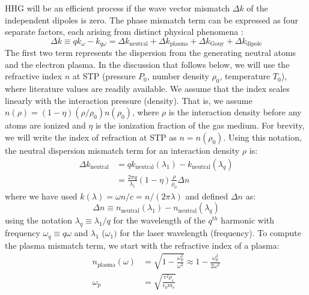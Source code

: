 HHG will be an efficient process if the wave vector mismatch $\Delta k$ of the independent dipoles is zero. The phase mismatch term can be expressed as four separate factors, each arising from distinct physical phenomena \cite{rothhardtAbsorptionlimitedPhasematchedHigh2014}:
\begin{equation}
\Delta k \equiv q k_{\omega} - k_{q \omega} = \Delta k_{\textrm{neutral}} + \Delta k_{\textrm{plasma}} + \Delta k_{\textrm{Gouy}} + \Delta k_{\textrm{dipole}}
\label{eqn:phase_mismatch}
\end{equation}
The first two term represents the dispersion from the generating neutral atoms and the electron plasma. In the discussion that follows below, we will use the refractive index $n$ at STP (pressure $P_0$, number density $\rho_0$, temperature $T_0$), where literature values are readily available. We assume that the index scales linearly with the interaction pressure (density). That is, we assume $n(\rho) = (1-\eta)(\rho / \rho_0) n(\rho_0)$, where $\rho$ is the interaction density before any atoms are ionized and $\eta$ is the ionization fraction of the gas medium. For brevity, we will write the index of refraction at STP as $n = n(\rho_0)$. Using this notation, the neutral dispersion mismatch term for an interaction density $\rho$ is:
\begin{align}
\Delta k_{\textrm{neutral}} &= q k_{\textrm{neutral}}(\lambda_1) - k_{\textrm{neutral}}(\lambda_{q}) \nonumber \\
&= \frac{2 \pi q}{\lambda_1} (1-\eta) \frac{\rho}{\rho_0}\Delta n
\label{eqn:deltak_neutral}
\end{align}
where we have used $k(\lambda)= \omega n /c = n / (2 \pi \lambda)$ and defined $\Delta n$ as:
\begin{equation}
\Delta n \equiv n_{\textrm{neutral}}(\lambda_1) - n_{\textrm{neutral}}(\lambda_q)
\end{equation}
using the notation $\lambda_q \equiv \lambda_1 / q$ for the wavelength of the $q^{th}$ harmonic with frequency $\omega_q \equiv q \omega$ and $\lambda_1$ ($\omega_1)$ for the laser wavelength (frequency). To compute the plasma mismatch term, we start with the refractive index of a plasma:
\begin{align}
n_{\textrm{plasma}}(\omega) &= \sqrt{1 - \frac{\omega_p^2}{\omega^2}} \approx 1 - \frac{\omega_p^2}{2 \omega^2} \\
\omega_p &= \sqrt{\frac{e^2 \rho_e}{\epsilon_0 m_e}}
\end{align}
